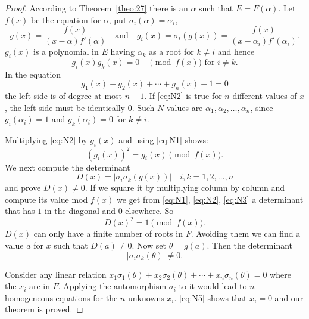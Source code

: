 \documentclass[10pt,leqno]{article}
\theoremstyle{definition}
\begin{document}
\begin{proof}
According to Theorem~\ref{theo:27} there is an $\alpha$ such that $E = F(\alpha)$.
Let $f(x)$ be the equation for $\alpha$, put $\sigma_i(\alpha) = \alpha_i$,
\[
g(x) = \frac{f(x)}{(x-\alpha)f'(\alpha)}
\quad\text{and}\quad
g_i(x) = \sigma_i(g(x))
= \frac{f(x)}{(x - \alpha_i)f'(\alpha_i)}.
\]
$g_i(x)$ is a polynomial in $E$ having $\alpha_k$ as a root for $k\not= i$ and hence
\begin{equation}
\label{eq:N1}
g_i(x) g_k(x) = 0
\quad
\text{$\pmod{f(x)}$ for $i \not= k$}.
\end{equation}
In the equation
\begin{equation}
\label{eq:N2}
g_1(x) + g_2(x) + \cdots + g_n(x) - 1 = 0
\end{equation}
the left side is of degree at most $n-1$.
If \eqref{eq:N2} is true for $n$ different values of $x$, the left side must be identically $0$.
Such $N$ values are $\alpha_1, \alpha_2, \ldots, \alpha_n$, since $g_i(\alpha_i) = 1$ and $g_k(\alpha_i) = 0$ for $k \not= i$.

Multiplying \eqref{eq:N2} by $g_i(x)$ and using \eqref{eq:N1} shows:
\begin{equation}
\label{eq:N3}
(g_i(x))^2 = g_i(x) \pmod{f(x)}.
\end{equation}
We next compute the determinant
\begin{equation}
\label{eq:N4}
D(x) = |\sigma_i \sigma_k (g(x)) |
\quad
i,k = 1,2,\ldots,n
\end{equation}
and prove $D(x) \not= 0$.
If we square it by multiplying column by column and compute its value mod $f(x)$ we get from \eqref{eq:N1}, \eqref{eq:N2}, \eqref{eq:N3} a determinant that has $1$ in the diagonal and $0$ elsewhere.
So
\[
D(x)^2 = 1 \pmod{f(x)}.
\]
$D(x)$ can only have a finite number of roots in $F$.
Avoiding them we can find a value $a$ for $x$ such that $D(a) \not= 0$.
Now set $\theta = g(a)$.
Then the determinant
\begin{equation}
\label{eq:N5}
|\sigma_i \sigma_k (\theta) | \not= 0.
\end{equation}

Consider any linear relation $x_1 \sigma_1(\theta) + x_2 \sigma_2(\theta) + \cdots + x_n \sigma_n(\theta) = 0$ where the $x_i$ are in $F$.
Applying the automorphism $\sigma_i$ to it would lead to $n$ homogeneous equations for the $n$ unknowns $x_i$.
\eqref{eq:N5} shows that $x_i = 0$ and our theorem is proved.
\end{proof}
\end{document}
